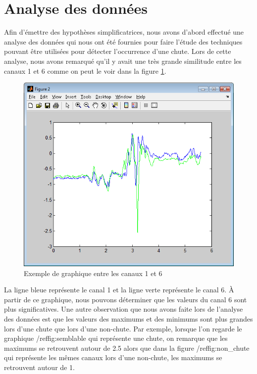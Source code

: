 \documentclass[12pt,letterpaper]{article}
\begin{document}
\section{Analyse des données} %
Afin d'émettre des hypothèses simplificatrices, nous avons d'abord effectué une analyse des données qui nous ont été fournies pour faire l'étude des techniques pouvant être utilisées pour détecter l'occurrence d'une chute. Lors de cette analyse, nous avons remarqué qu'il y avait une très grande similitude entre les canaux 1 et 6 comme on peut le voir dans la figure \ref{fig:semblable}.

\begin{figure}
\centering
\includegraphics[scale=0.5]{images/semblable.png}
\caption{Exemple de graphique entre les canaux 1 et 6}
\label{fig:semblable}
\end{figure}

La ligne bleue représente le canal 1 et la ligne verte représente le canal 6. À partir de ce graphique, nous pouvons déterminer que les valeurs du canal 6 sont plus significatives. Une autre observation que nous avons faite lors de l'analyse des données est que les valeurs des maximums et des minimums sont plus grandes lors d'une chute que lors d'une non-chute. Par exemple, lorsque l'on regarde le graphique /ref{fig:semblable} qui représente une chute, on remarque que les maximums se retrouvent autour de 2.5 alors que dans la figure /ref{fig:non\_chute} qui représente les mêmes canaux lors d'une non-chute, les maximums se retrouvent autour de 1.
\end{document}
